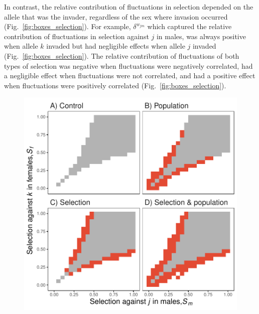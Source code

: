 \begin{refsection}
In contrast, the relative contribution of fluctuations in selection depended on the allele that was the invader, regardless of the sex where invasion occurred (Fig.~\ref{fig:boxes_selection}). For example, $\delta^{w_{jm}}$ which captured the relative contribution of fluctuations in selection against $j$ in males, was always positive when allele $k$ invaded but had negligible effects when allele $j$ invaded (Fig.~\ref{fig:boxes_selection}). The relative contribution of fluctuations of both types of selection was negative when fluctuations were negatively correlated, had a negligible effect when fluctuations were not correlated, and had a positive effect when fluctuations were positively correlated (Fig.~\ref{fig:boxes_selection}).


\begin{figure}[H]
  \centerline{\includegraphics[width=1\textwidth]{figures/chapter4_fig2}}

\end{figure}
\end{refsection}
